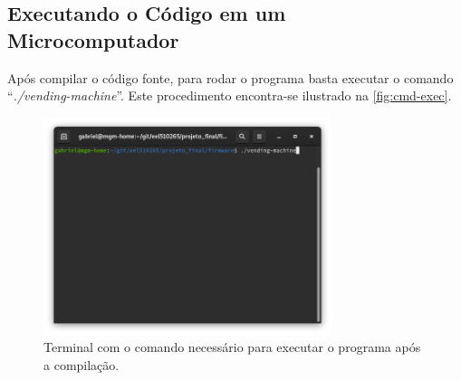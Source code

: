 \subsection{Executando o Código em um Microcomputador}

Após compilar o código fonte, para rodar o programa basta executar o comando ``\textit{./vending-machine}''. Este procedimento encontra-se ilustrado na \autoref{fig:cmd-exec}.

\begin{figure}[!ht]
    \begin{center}
        \includegraphics[width=0.75\textwidth]{figures/window-cmd-exec.png}
        \caption{Terminal com o comando necessário para executar o programa após a compilação.}
        \label{fig:cmd-exec}
    \end{center}
\end{figure}
